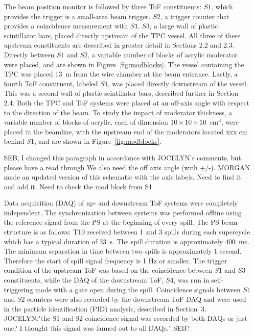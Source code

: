     The beam position monitor is followed by three ToF constituents: $S1$, which provides the trigger is a small-area beam trigger. $S2$, a trigger counter that provides a coincidence measurement with $S1$. $S3$, a large wall of plastic scintillator bars, placed directly upstream of the TPC vessel. All three of these upstream constituents are described in greater detail in Sections 2.2 and 2.3. Directly between $S1$ and $S2$, a variable number of blocks of acrylic moderator were placed, and are shown in Figure~\ref{fig:modblocks}. The vessel containing the TPC was placed 13~m from the wire chamber at the beam entrance. Lastly, a fourth ToF constituent, labeled $S4$, was placed directly downstream of the vessel. This was a second wall of plastic scintillator bars, described further in Section 2.4. Both the TPC and ToF systems were placed at an off-axis angle with respect to the direction of the beam. To study the impact of moderator thickness, a variable number of blocks of acrylic, each of dimension $10\times10\times10$~cm$^3$, were placed in the beamline, with the upstream end of the moderators located xxx cm behind $S1$, and are shown in Figure~\ref{fig:modblocks}.
    
    SEB, I changed this paragraph in accordance with JOCELYN's comments, but please have a read through
    We also need the off axis angle (with +/-). MORGAN made an updated version of this schematic with the axis labels. Need to find it and add it. Need to check the mod block from S1
    
    Data acquisition (DAQ) of up- and downstream ToF systems were completely independent. The synchronization between systems was performed offline using the reference signal from the PS at the beginning of every spill. The PS beam structure is as follows: T10 received between 1 and 3 spills during each supercycle which has a typical duration of 33~s. The spill duration is approximately 400~ms. The minimum separation in time between two spills is approximately 1 second. Therefore the start of spill signal frequency is 1 Hz or smaller. The trigger condition of the upstream ToF was based on the coincidence between $S1$ and $S3$ constituents, while the DAQ of the downstream ToF, $S4$, was run in self-triggering mode with a gate open during the spill. Coincidence signals between $S1$ and $S2$ counters were also recorded by the downstream ToF DAQ and were used in the particle identification (PID) analysis, described in Section~3. 
    JOCELYN:"the S1 and S2 coincidence signal was recorded by both DAQs or just one? I thought this signal was fanned out to all DAQs." SEB?
    

